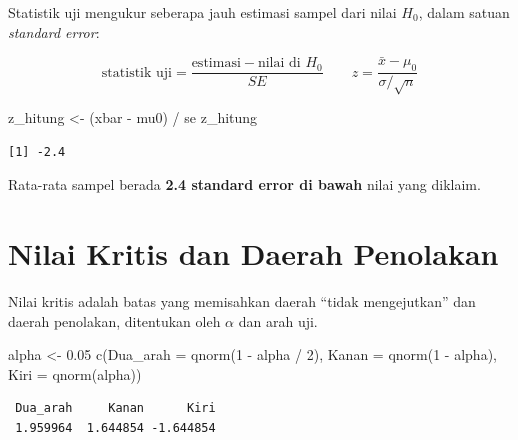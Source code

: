 \documentclass[
  indonesian,
  letterpaper,
]{book}
\newenvironment{Shaded}{\begin{snugshade}}{\end{snugshade}}
\newcommand{\AttributeTok}[1]{\textcolor[rgb]{0.40,0.45,0.13}{#1}}
\newcommand{\DecValTok}[1]{\textcolor[rgb]{0.68,0.00,0.00}{#1}}
\newcommand{\FloatTok}[1]{\textcolor[rgb]{0.68,0.00,0.00}{#1}}
\newcommand{\FunctionTok}[1]{\textcolor[rgb]{0.28,0.35,0.67}{#1}}
\newcommand{\NormalTok}[1]{\textcolor[rgb]{0.00,0.23,0.31}{#1}}
\newcommand{\OtherTok}[1]{\textcolor[rgb]{0.00,0.23,0.31}{#1}}
\newcommand{\SpecialCharTok}[1]{\textcolor[rgb]{0.37,0.37,0.37}{#1}}
\begin{document}
Statistik uji mengukur seberapa jauh estimasi sampel dari nilai \(H_0\),
dalam satuan \emph{standard error}:

\[
\text{statistik uji} = \frac{\text{estimasi} - \text{nilai di } H_0}{SE}
\qquad
z = \frac{\bar{x} - \mu_0}{\sigma/\sqrt{n}}
\]

\begin{Shaded}
\begin{Highlighting}[]
\NormalTok{z\_hitung }\OtherTok{\textless{}{-}}\NormalTok{ (xbar }\SpecialCharTok{{-}}\NormalTok{ mu0) }\SpecialCharTok{/}\NormalTok{ se}
\NormalTok{z\_hitung}
\end{Highlighting}
\end{Shaded}

\begin{verbatim}
[1] -2.4
\end{verbatim}

Rata-rata sampel berada \textbf{2.4 standard error di bawah} nilai yang
diklaim.

\section{Nilai Kritis dan Daerah
Penolakan}\label{nilai-kritis-dan-daerah-penolakan}

Nilai kritis adalah batas yang memisahkan daerah ``tidak mengejutkan''
dan daerah penolakan, ditentukan oleh \(\alpha\) dan arah uji.

\begin{Shaded}
\begin{Highlighting}[]
\NormalTok{alpha }\OtherTok{\textless{}{-}} \FloatTok{0.05}
\FunctionTok{c}\NormalTok{(}\AttributeTok{Dua\_arah =} \FunctionTok{qnorm}\NormalTok{(}\DecValTok{1} \SpecialCharTok{{-}}\NormalTok{ alpha }\SpecialCharTok{/} \DecValTok{2}\NormalTok{), }\AttributeTok{Kanan =} \FunctionTok{qnorm}\NormalTok{(}\DecValTok{1} \SpecialCharTok{{-}}\NormalTok{ alpha), }\AttributeTok{Kiri =} \FunctionTok{qnorm}\NormalTok{(alpha))}
\end{Highlighting}
\end{Shaded}

\begin{verbatim}
 Dua_arah     Kanan      Kiri 
 1.959964  1.644854 -1.644854 
\end{verbatim}
\end{document}
